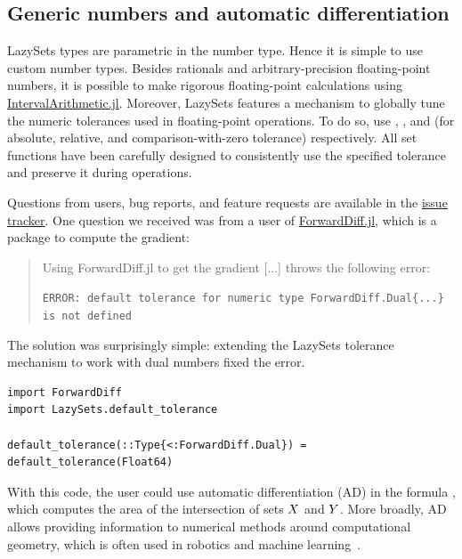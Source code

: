 \subsection{Generic numbers and automatic differentiation}\label{sec:numbertypes}

LazySets types are parametric in the number type. Hence it is simple to use custom number types.
%
Besides rationals and arbitrary-precision floating-point numbers, it is possible to make rigorous floating-point calculations using \href{https://github.com/JuliaIntervals/IntervalArithmetic.jl}{IntervalArithmetic.jl}.
%
Moreover, LazySets features a mechanism to globally tune the numeric tolerances used in floating-point operations.
%
To do so, use , , and  (for absolute, relative, and comparison-with-zero tolerance) respectively.
%
All set functions have been carefully designed to consistently use the specified tolerance and preserve it during operations.

\smallskip

Questions from users, bug reports, and feature requests are available in the \href{https://github.com/JuliaReach/LazySets.jl/issues/}{issue tracker}.
%
One question we received was from a user of \href{https://github.com/JuliaDiff/ForwardDiff.jl}{ForwardDiff.jl}, which is a package to compute the gradient:

\begin{quote}
	Using ForwardDiff.jl to get the gradient [...] throws the following error:

\texttt{ERROR: default tolerance for numeric type ForwardDiff.Dual\{...\} is not defined}
\end{quote}

The solution was surprisingly simple: extending the LazySets tolerance mechanism to work with dual numbers fixed the error.

\begin{minipage}{\linewidth}
	\vspace{-\abovedisplayskip}
	\begin{lstlisting}
import ForwardDiff
import LazySets.default_tolerance

default_tolerance(::Type{<:ForwardDiff.Dual}) = default_tolerance(Float64)
	\end{lstlisting}
\end{minipage}
With this code, the user could use automatic differentiation (AD) in the formula , which computes the area of the intersection of sets $X$ and $Y$. More broadly, AD allows providing information to numerical methods around computational geometry, which is often used in robotics and machine learning~\cite{featherstone2014rigid,BaydinPRS17}.

